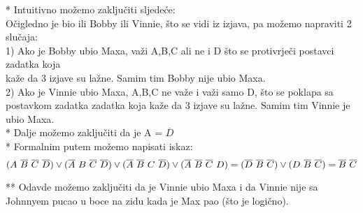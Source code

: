 \documentclass[12pt]{article}
\begin{document}
\begin{enumerate}
        * Intuitivno možemo zaključiti sljedeće: \\
        Očigledno je bio ili Bobby ili Vinnie, što se vidi iz izjava, pa možemo napraviti 
        2 slučaja: \\
        
        1) Ako je Bobby ubio Maxa, važi A,B,C ali ne i D što se protivrječi postavci zadatka koja \\
        kaže da 3 izjave su lažne. Samim tim Bobby nije ubio Maxa. \\
        2) Ako je Vinnie ubio Maxa, A,B,C ne važe i važi samo D, što se poklapa sa postavkom zadatka zadatka koja 
        kaže da 3 izjave su lažne. Samim tim Vinnie je ubio Maxa. \\
        
        * Dalje možemo zaključiti da je A = {$\overline{D}$} \\
        * Formalnim putem možemo napisati iskaz: \\
        \begin{equation*}
            (A~\overline{B}~\overline{C}~\overline{D})
            \vee (\overline{A}~B~\overline{C}~\overline{D}) \vee
            (\overline{A}~\overline{B}~C~\overline{D}) \vee
            (\overline{A}~\overline{B}~\overline{C}~D) = 
            (\overline{D}~\overline{B}~\overline{C}) \vee
            (D~\overline{B}~\overline{C}) = \overline{B}~\overline{C} \\
        \end{equation*}       
        
        ** Odavde možemo zaključiti da je Vinnie ubio Maxa i da Vinnie nije sa Johnnyem pucao u boce na zidu kada je Max pao (što je logično).\\
        
        
        
	\end{enumerate}
	
	
	
    
\end{document}
